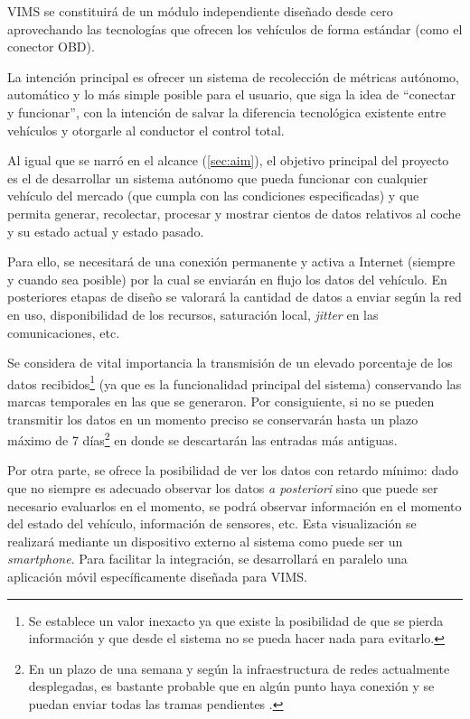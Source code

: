 \ac{VIMS} se constituirá de un módulo independiente diseñado desde cero aprovechando
las tecnologías que ofrecen los vehículos de forma estándar (como el conector
\ac{OBD}).

La intención principal es ofrecer un sistema de recolección de métricas autónomo,
automático y lo más simple posible para el usuario, que siga la idea de ``conectar y funcionar'',
con la intención de salvar la diferencia tecnológica existente entre vehículos
y otorgarle al conductor el control total.

Al igual que se narró en el alcance (\ref{sec:aim}), el objetivo principal del proyecto es
el de desarrollar un sistema autónomo que pueda funcionar con cualquier vehículo
del mercado (que cumpla con las condiciones especificadas) y que permita generar,
recolectar, procesar y mostrar cientos de datos relativos al coche y su estado
actual y estado pasado.

Para ello, se necesitará de una conexión permanente y activa a Internet (siempre
y cuando sea posible) por la cual se enviarán en flujo los datos del vehículo.
En posteriores etapas de diseño se valorará la cantidad de datos a enviar según
la red en uso, disponibilidad de los recursos, saturación local, \textit{jitter}
en las comunicaciones, etc.

Se considera de vital importancia la transmisión de un elevado porcentaje de los
datos recibidos\footnote{Se establece
un valor inexacto ya que existe la posibilidad de que se pierda información y que desde el
sistema no se pueda hacer nada para evitarlo.} (ya que es la funcionalidad principal 
del sistema) conservando las
marcas temporales en las que se generaron. Por consiguiente, si no se pueden
transmitir los datos en un momento preciso se conservarán hasta un plazo máximo de
7 días\footnote{En un plazo de una semana y según la infraestructura de redes
actualmente desplegadas, es bastante probable que en algún punto haya conexión
y se puedan enviar todas las tramas pendientes \cite{MobileIoTDeployment,loraallianceCoverageOperatorMaps}.} en donde se descartarán las
entradas más antiguas.

Por otra parte, se ofrece la posibilidad de ver los datos con retardo mínimo: dado que
no siempre es adecuado observar los datos \textit{a posteriori} sino que puede ser necesario evaluarlos en el momento, se podrá observar información en
el momento del estado del vehículo, información de sensores, etc. Esta
visualización se realizará mediante un dispositivo externo al sistema como
puede ser un \textit{smartphone}. Para facilitar la integración, se desarrollará
en paralelo una aplicación móvil específicamente diseñada para \ac{VIMS}.


